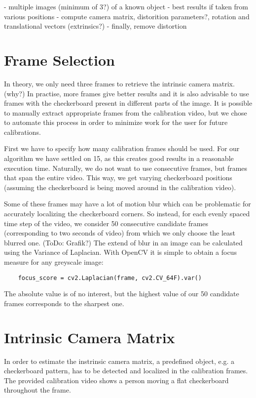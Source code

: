 \documentclass[bibliography=totoc]{scrartcl}
\begin{document}
- multiple images (minimum of 3?) of a known object
- best results if taken from various positions
- compute camera matrix, distorition parameters?, rotation and translational vectors (extrinsics?)
- finally, remove distortion

\section{Frame Selection}
In theory, we only need three frames to retrieve the intrinsic camera matrix. (why?)
In practise, more frames give better results and it is also advisable to use frames with the checkerboard present in different parts of the image.
It is possible to manually extract appropriate frames from the calibration video, but we chose to automate this process in order to minimize work for the user for future calibrations. 

First we have to specify how many calibration frames should be used. 
For our algorithm we have settled on 15, as this creates good results in a reasonable execution time.
Naturally, we do not want to use consecutive frames, but frames that span the entire video. 
This way, we get varying checkerboard positions (assuming the checkerboard is being moved around in the calibration video).

Some of these frames may have a lot of motion blur which can be problematic for accurately localizing the checkerboard corners.
So instead, for each evenly spaced time step of the video, we consider 50 consecutive candidate frames (corresponding to two seconds of video) from which we only choose the least blurred one. (ToDo: Grafik?)
The extend of blur in an image can be calculated using the Variance of Laplacian. \cite{BlurDetection}
With OpenCV it is simple to obtain a focus measure for any greyscale image:

\begin{lstlisting}
    focus_score = cv2.Laplacian(frame, cv2.CV_64F).var()
\end{lstlisting}

The absolute value is of no interest, but the highest value of our 50 candidate frames corresponds to the sharpest one.

\section{Intrinsic Camera Matrix}
In order to estimate the instrinsic camera matrix, a predefined object, e.g. a checkerboard pattern, has to be detected and localized in the calibration frames.
The provided calibration video shows a person moving a flat checkerboard throughout the frame.
\end{document}

